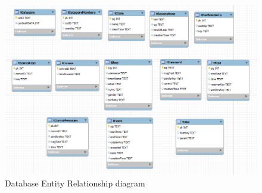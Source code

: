\begin{landscape}
\begin{figure}[h]
    
    \includegraphics[width=1.4\textwidth]{images/design/db_shot.png}
    \caption{Database Entity Relationship diagram}
    \label{fig:db_er_diag}
\end{figure}
\end{landscape}

